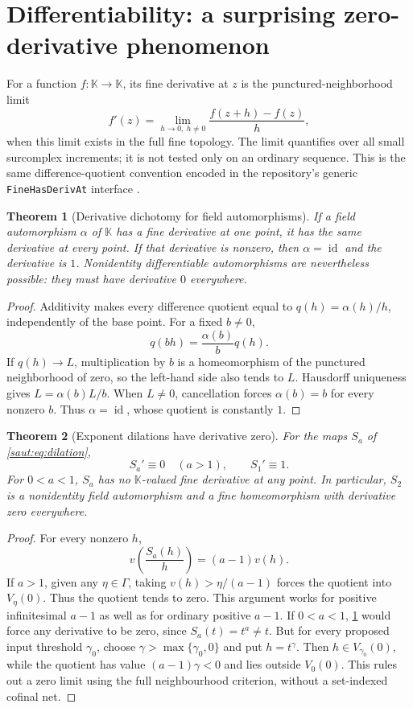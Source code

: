 \documentclass[11pt]{article}
\newtheorem{theorem}{Theorem}[section]
\theoremstyle{definition}
\theoremstyle{remark}
\newcommand{\K}{\mathbb K}
\newcommand{\id}{\operatorname{id}}
\numberwithin{equation}{section}
\begin{document}
\section{Differentiability: a surprising zero-derivative phenomenon}\label{saut:sec:derivative}

For a function $f:\K\to\K$, its fine derivative at $z$ is the
punctured-neighborhood limit
\[
 f'(z)=\lim_{h\to0,\ h\ne0}\frac{f(z+h)-f(z)}h,
\]
when this limit exists in the full fine topology. The limit quantifies over
all small surcomplex increments; it is not tested only on an ordinary
sequence. This is the same difference-quotient convention encoded in the
repository's generic \texttt{FineHasDerivAt} interface \cite{RepoFine}.

\begin{theorem}[Derivative dichotomy for field automorphisms]\label{saut:thm:derivative}
If a field automorphism $\alpha$ of $\K$ has a fine derivative at one point,
it has the same derivative at every point. If that derivative is nonzero,
then $\alpha=\id$ and the derivative is $1$.
Nonidentity differentiable automorphisms are nevertheless possible: they
must have derivative $0$ everywhere.
\end{theorem}
\begin{proof}
Additivity makes every difference quotient equal to
$q(h)=\alpha(h)/h$, independently of the base point. For a fixed $b\ne0$,
\[
 q(bh)=\frac{\alpha(b)}bq(h).
\]
If $q(h)\to L$, multiplication by $b$ is a homeomorphism of the punctured
neighborhood of zero, so the left-hand side also tends to $L$.
Hausdorff uniqueness gives $L=\alpha(b)L/b$. When $L\ne0$, cancellation
forces $\alpha(b)=b$ for every nonzero $b$. Thus $\alpha=\id$, whose
quotient is constantly $1$.
\end{proof}

\begin{theorem}[Exponent dilations have derivative zero]\label{saut:thm:zeroderiv}
For the maps $S_a$ of \eqref{saut:eq:dilation},
\[
 S_a'\equiv0\quad(a>1),\qquad S_1'\equiv1.
\]
For $0<a<1$, $S_a$ has no $\K$-valued fine derivative at any point.
In particular, $S_2$ is a nonidentity field automorphism and a fine
homeomorphism with derivative zero everywhere.
\end{theorem}
\begin{proof}
For every nonzero $h$,
\begin{equation}\label{saut:eq:dilationquot}
 v\left(\frac{S_a(h)}h\right)=(a-1)v(h).
\end{equation}
If $a>1$, given any $\eta\in\Gamma$, taking
$v(h)>\eta/(a-1)$ forces the quotient into $V_\eta(0)$.
Thus the quotient tends to zero. This argument works for positive
infinitesimal $a-1$ as well as for ordinary positive $a-1$.
If $0<a<1$, \cref{saut:thm:derivative} would force any derivative to be
zero, since $S_a(t)=t^a\ne t$. But for every proposed input threshold
$\gamma_0$, choose $\gamma>\max\{\gamma_0,0\}$ and put $h=t^\gamma$.
Then $h\in V_{\gamma_0}(0)$, while the quotient has value
$(a-1)\gamma<0$ and lies outside $V_0(0)$. This rules out a zero limit
using the full neighbourhood criterion, without a set-indexed cofinal net.
\end{proof}
\end{document}
